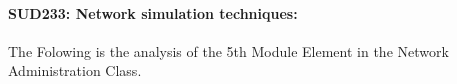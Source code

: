 \documentclass[12pt]{extreport}
\begin{document}
\begin{comment}
\subparagraph{Interpretation of the Box-plots:}
For This Element 


\begin{comment}


\begin{enumerate}	
	\item The MP Class Box-Plot:
	\begin{enumerate}
		\item MAX = a {} {} {} {} {} {} {} {} UQ = b {} {} {} {} {} {} {} {} Median = c
		\item LQ = d {} {} {} {} {} {} {} {}  MIN =	l {} {} {} {} {} {} {} {}  IQR = e - f = g
	\end{enumerate}
	\item The PSI Class Box-Plot:
	\begin{enumerate}
		\item MAX = a {} {} {} {} {} {} {} {} UQ = b {} {} {} {} {} {} {} {} Median = c
		\item LQ = d {} {} {} {} {} {} {} {}  MIN =	e {} {} {} {} {} {} {} {} IQR = f - g = h	
	\end{enumerate}
	\item The TSI Class Box-Plot:
	\begin{enumerate}
		\item MAX = a {} {} {} {} {} {} {} {} UQ = b {} {} {} {} {} {} {} {} Median = c
		\item LQ = d {} {} {} {} {} {} {} {} MIN = e {} {} {} {} {} {} {} {} IQR = f - g = h	
	\end{enumerate}
\end{enumerate}



\subparagraph{Interpretation of the histogram:}
This Frequency Distribution is (Skeness) with the following descriptive statistics:
\begin{enumerate}
	\item Mean = 
	\item STD = 
	\item Range = a - b = c
	\item IQR = a-b = c 
\end{enumerate}
\end{comment}




\paragraph{\large SUD233: Network simulation techniques:\\
 } 
The Folowing is the analysis of the 5th Module Element in the Network Administration Class.
\end{document}
